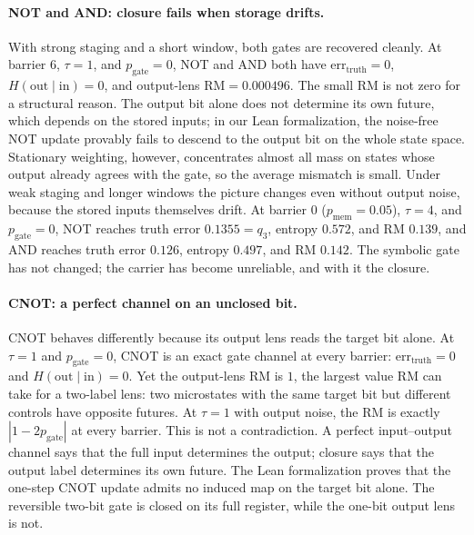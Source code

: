 \paragraph{NOT and AND: closure fails when storage drifts.}
With strong staging and a short window, both gates are recovered cleanly. At barrier \(6\), \(\tau=1\), and \(p_{\mathrm{gate}}=0\), NOT and AND both have \(\mathrm{err}_{\mathrm{truth}}=0\), \(H(\mathrm{out}\mid\mathrm{in})=0\), and output-lens \(\mathrm{RM}=0.000496\). The small RM is not zero for a structural reason. The output bit alone does not determine its own future, which depends on the stored inputs; in our Lean formalization, the noise-free NOT update provably fails to descend to the output bit on the whole state space. Stationary weighting, however, concentrates almost all mass on states whose output already agrees with the gate, so the average mismatch is small. Under weak staging and longer windows the picture changes even without output noise, because the stored inputs themselves drift. At barrier \(0\) (\(p_{\mathrm{mem}}=0.05\)), \(\tau=4\), and \(p_{\mathrm{gate}}=0\), NOT reaches truth error \(0.1355=q_3\), entropy \(0.572\), and RM \(0.139\), and AND reaches truth error \(0.126\), entropy \(0.497\), and RM \(0.142\). The symbolic gate has not changed; the carrier has become unreliable, and with it the closure.

\paragraph{CNOT: a perfect channel on an unclosed bit.}
CNOT behaves differently because its output lens reads the target bit alone. At \(\tau=1\) and \(p_{\mathrm{gate}}=0\), CNOT is an exact gate channel at every barrier: \(\mathrm{err}_{\mathrm{truth}}=0\) and \(H(\mathrm{out}\mid\mathrm{in})=0\). Yet the output-lens RM is \(1\), the largest value RM can take for a two-label lens: two microstates with the same target bit but different controls have opposite futures. At \(\tau=1\) with output noise, the RM is exactly \(|1-2p_{\mathrm{gate}}|\) at every barrier. This is not a contradiction. A perfect input--output channel says that the full input determines the output; closure says that the output label determines its own future. The Lean formalization proves that the one-step CNOT update admits no induced map on the target bit alone. The reversible two-bit gate is closed on its full register, while the one-bit output lens is not.

